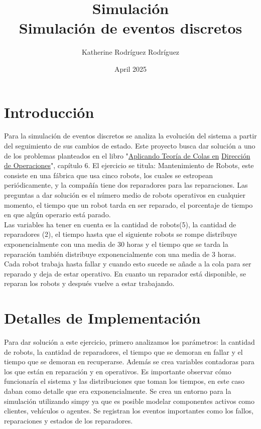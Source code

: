 \documentclass{article}
\begin{document}
   \title{Simulación \\ \large Simulación de eventos discretos}
\author{Katherine Rodríguez Rodríguez}
\date{April 2025}
    \maketitle
    
    \section{Introducción}
Para la simulación de eventos discretos se analiza la evolución del sistema a partir del seguimiento de sus cambios de estado. Este proyecto busca dar solución a uno de los problemas planteados en el libro "\underline{Aplicando Teoría de Colas en} \underline{Dirección de Operaciones}", capítulo 6. El ejercicio se titula: Mantenimiento de Robots, este consiste en una fábrica que usa cinco robots, los cuales se estropean periódicamente, y la compañía tiene dos reparadores para las reparaciones. Las preguntas a dar solución es el número medio de robots operativos en cualquier momento, el tiempo que un robot tarda en ser reparado, el porcentaje de tiempo en que algún operario está parado. \\ 
Las variables ha tener en cuenta es la cantidad de robots(5), la cantidad de reparadores (2), el tiempo hasta que el siguiente robots se rompe distribuye exponencialmente con una media de 30 horas y el tiempo que se tarda la reparación también distribuye exponencialmente con una media de 3 horas. \\
Cada robot trabaja hasta fallar y cuando esto sucede se añade a la cola para ser reparado y deja de estar operativo. En cuanto un reparador está disponible, se reparan los robots y después vuelve a estar trabajando.
\section{Detalles de Implementación}
Para dar solución a este ejercicio, primero analizamos los parámetros: la cantidad de robots, la cantidad de reparadores, el tiempo que se demoran en fallar y el tiempo que se demoran en recuperarse. Además se crea variables contadoras para los que están en reparación y en operativos. Es importante observar cómo funcionaría el sistema y las distribuciones que toman los tiempos, en este caso daban como detalle que era exponencialmente. Se crea un entorno para la simulación utilizando simpy ya que es posible modelar componentes activos como clientes, vehículos o agentes. Se registran los eventos importantes como los fallos, reparaciones y estados de los reparadores.
\end{document}
